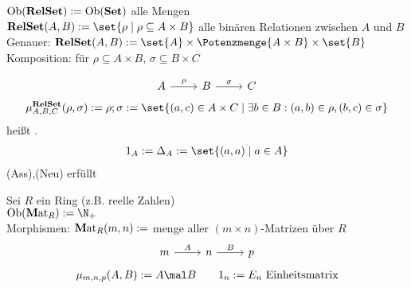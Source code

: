 \begin{beispiel}[\ul{RelSet}]\label{beisp1.6RelSet}\enter
	$\operatorname{Ob}(\operatorname{\mathbf{RelSet}}):=\operatorname{Ob}(\operatorname{\mathbf{Set}})$ alle Mengen\\
	$\RelSet(A,B):=\set{\rho\mid\rho\subseteq A\times B}$ alle binären Relationen zwischen $A$ und $B$\\
	Genauer: $\RelSet(A,B):=\set{A}\times\Potenzmenge{A\times B}\times\set{B}$\\
	Komposition: für $\rho\subseteq A\times B$, $\sigma\subseteq B\times C$

	$$
	\begin{tikzcd}[ampersand replacement=\&]
		A \arrow{r}{\rho} \& B \arrow{r}{\sigma} \& C
  	\end{tikzcd}
	$$
	\begin{align*}
		\mu_{A,B,C}^{\RelSet}(\rho,\sigma):=\rho;\sigma
		:=\set{(a,c)\in A\times C\mid\exists b\in B:(a,b)\in\rho,(b,c)\in\sigma}
	\end{align*}
	heißt .
	\begin{align*}
		1_A:=\Delta_A:=\set{(a,a)\mid a\in A}
	\end{align*}
	(Ass),(Neu) erfüllt
\end{beispiel}

\begin{beispiel}\label{beisp1.7Mat}\enter
	Sei $R$ ein Ring (z.B. reelle Zahlen)\\
	$\Ob(\Mat_R):=\N_+$\\
	Morphismen:
	$\operatorname{\mathbf Mat}_R(m,n):=$ menge aller $(m\times n)$-Matrizen über $R$
	$$
	\begin{tikzcd}[ampersand replacement=\&]
		m \arrow{r}{A} \& n \arrow{r}{B} \& p
  	\end{tikzcd}
	$$
	\begin{align*}
		\mu_{m,n,p}(A,B):=A\mal B\qquad 1_n:=E_n\text{ Einheitsmatrix}
	\end{align*}
\end{beispiel}

